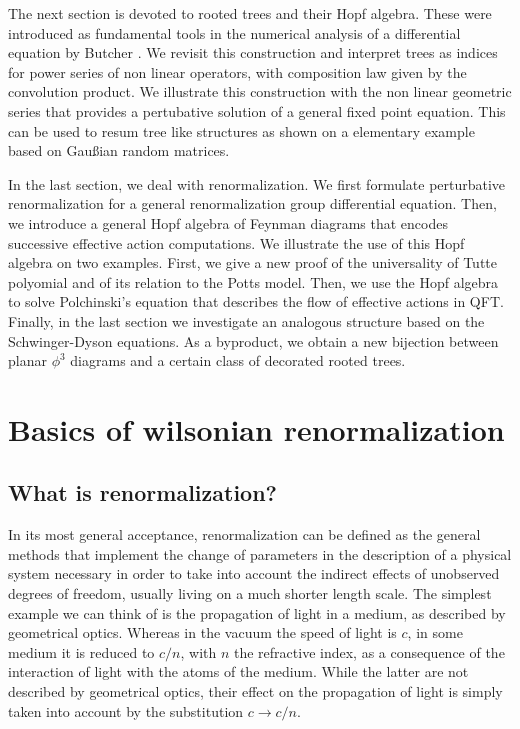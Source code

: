 \documentclass[10pt,here,feynmf]{article}
\begin{document}
The next section is devoted to rooted trees and their Hopf algebra. These were introduced as fundamental tools in the numerical analysis of a differential equation by Butcher \cite{butcher}. We revisit this construction and interpret trees as indices for power series of non linear operators, with composition law given by the convolution product. We illustrate this construction with the non linear geometric series that provides a pertubative solution of a general fixed point equation. This can be used to resum tree like structures as shown on a elementary example based on Gau\ss ian random matrices.

In the last section, we deal with renormalization. We first formulate perturbative renormalization for a general renormalization group differential equation. Then, we introduce a general Hopf algebra of Feynman diagrams that encodes successive effective action computations. We illustrate the use of this Hopf algebra on two examples. First, we give a new proof of the universality of Tutte polyomial and of its relation to the Potts model. Then, we use the Hopf algebra to solve Polchinski's equation that describes the flow of effective actions in QFT. Finally, in the last section we investigate an analogous structure based on the Schwinger-Dyson equations. As a byproduct, we obtain a new bijection between planar $\phi^{3}$ diagrams and a certain class of decorated rooted trees.  
 



\section{Basics of wilsonian renormalization}

\subsection{What is renormalization?}



In its most general acceptance, renormalization can be defined as the general methods that implement the change of parameters in the description of a physical system necessary in order to take into account the indirect effects of unobserved degrees of freedom, usually living on a much shorter length scale. The simplest example we can think of is the propagation of light in a medium, as described by geometrical optics. Whereas in the vacuum the speed of light is $c$, in some medium it is reduced to $c/n$, with $n$ the refractive index, as a consequence of the interaction of light with the atoms of the medium. While the latter are not described by geometrical optics, their effect on the propagation of light is simply taken into account by the substitution $c\rightarrow c/n$.
\end{document}
